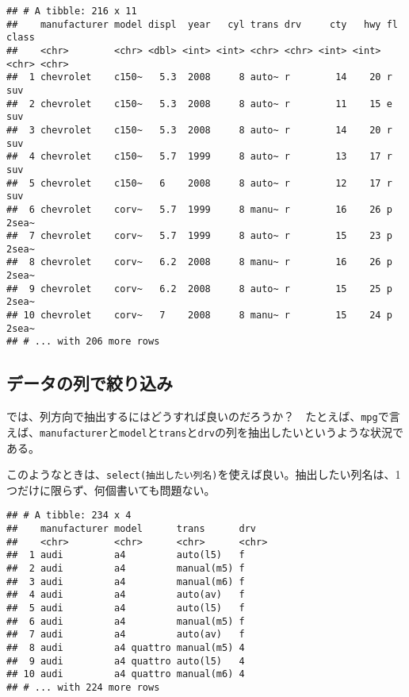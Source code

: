 \documentclass[]{book}
\newenvironment{Shaded}{\begin{snugshade}}{\end{snugshade}}
\newcommand{\KeywordTok}[1]{\textcolor[rgb]{0.13,0.29,0.53}{\textbf{#1}}}
\newcommand{\StringTok}[1]{\textcolor[rgb]{0.31,0.60,0.02}{#1}}
\newcommand{\CommentTok}[1]{\textcolor[rgb]{0.56,0.35,0.01}{\textit{#1}}}
\newcommand{\OperatorTok}[1]{\textcolor[rgb]{0.81,0.36,0.00}{\textbf{#1}}}
\newcommand{\NormalTok}[1]{#1}
\begin{document}
\begin{verbatim}
## # A tibble: 216 x 11
##    manufacturer model displ  year   cyl trans drv     cty   hwy fl    class
##    <chr>        <chr> <dbl> <int> <int> <chr> <chr> <int> <int> <chr> <chr>
##  1 chevrolet    c150~   5.3  2008     8 auto~ r        14    20 r     suv  
##  2 chevrolet    c150~   5.3  2008     8 auto~ r        11    15 e     suv  
##  3 chevrolet    c150~   5.3  2008     8 auto~ r        14    20 r     suv  
##  4 chevrolet    c150~   5.7  1999     8 auto~ r        13    17 r     suv  
##  5 chevrolet    c150~   6    2008     8 auto~ r        12    17 r     suv  
##  6 chevrolet    corv~   5.7  1999     8 manu~ r        16    26 p     2sea~
##  7 chevrolet    corv~   5.7  1999     8 auto~ r        15    23 p     2sea~
##  8 chevrolet    corv~   6.2  2008     8 manu~ r        16    26 p     2sea~
##  9 chevrolet    corv~   6.2  2008     8 auto~ r        15    25 p     2sea~
## 10 chevrolet    corv~   7    2008     8 manu~ r        15    24 p     2sea~
## # ... with 206 more rows
\end{verbatim}

\subsection{データの列で絞り込み}

では、列方向で抽出するにはどうすれば良いのだろうか？　たとえば、\texttt{mpg}で言えば、\texttt{manufacturer}と\texttt{model}と\texttt{trans}と\texttt{drv}の列を抽出したいというような状況である。

このようなときは、\texttt{select(抽出したい列名)}を使えば良い。抽出したい列名は、1つだけに限らず、何個書いても問題ない。

\begin{Shaded}
\end{Shaded}

\begin{verbatim}
## # A tibble: 234 x 4
##    manufacturer model      trans      drv  
##    <chr>        <chr>      <chr>      <chr>
##  1 audi         a4         auto(l5)   f    
##  2 audi         a4         manual(m5) f    
##  3 audi         a4         manual(m6) f    
##  4 audi         a4         auto(av)   f    
##  5 audi         a4         auto(l5)   f    
##  6 audi         a4         manual(m5) f    
##  7 audi         a4         auto(av)   f    
##  8 audi         a4 quattro manual(m5) 4    
##  9 audi         a4 quattro auto(l5)   4    
## 10 audi         a4 quattro manual(m6) 4    
## # ... with 224 more rows
\end{verbatim}
\end{document}
